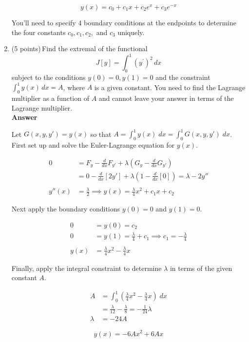 \documentclass[12pt]{article}
\begin{document}
\begin{enumerate}
$$\boxed{ y(x) = c_0 + c_1x + c_2e^x + c_3 e^{-x} }$$

You'll need to specify 4 boundary conditions at the endpoints to determine the four constants $c_0,c_1,c_2,$ and $c_3$ uniquely. 


\newpage
\item(5 points)\,Find the extremal of the functional
$$
J[y] = \int_0^1 (y^{\prime})^2\,dx
$$
subject to the conditions $y(0) = 0, y(1) = 0$ and the constraint $\int_0^1 y(x)\,dx = A$, where $A$ is a given constant. You need to find the Lagrange multiplier as a function of $A$ and cannot leave your answer in terms of the Lagrange multiplier.\\

{\bf Answer}

Let $G(x,y,y') = y(x)$ so that $A = \int_0^1 y(x) \; dx = \int_0^1 G(x,y,y') \; dx$. First set up and solve the Euler-Lagrange equation for $y(x)$. 

\begin{align*}
0 &= F_y - \frac{d}{dx}F_{y'} + \lambda (G_y - \frac{d}{dx}G_{y'}) \\
&= 0 - \frac{d}{dx}[2y'] + \lambda(1 - \frac{d}{dx}[0]) = \lambda - 2y'' \\
& \\
y''(x) &= \frac{\lambda}{2} \implies y(x) = \frac{\lambda}{4}x^2 + c_1x + c_2
\end{align*}

Next apply the boundary conditions $y(0) = 0$ and $y(1) = 0$.

\begin{align*}
0 &= y(0) = c_2 \\
0 &= y(1) = \frac{\lambda}{4}+c_1 \implies c_1 = -\frac{\lambda}{4} \\
& \\
y(x) &= \frac{\lambda}{4}x^2 - \frac{\lambda}{4}x
\end{align*}

Finally, apply the integral constraint to determine $\lambda$ in terms of the given constant $A$.

\begin{align*}
A &= \int_0^1 \left(\frac{\lambda}{4}x^2 - \frac{\lambda}{4}x\right) \; dx \\
&= \frac{\lambda}{12} - \frac{\lambda}{8} = -\frac{1}{24}\lambda \\
\lambda &= -24A
\end{align*}

$$\boxed{ y(x) = -6Ax^2 + 6Ax } $$

\end{enumerate}
\end{document}
